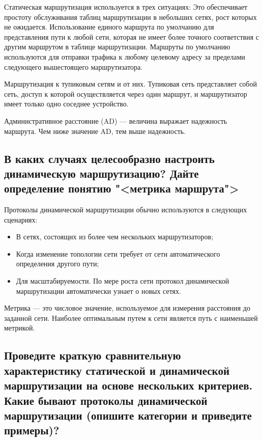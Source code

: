 Статическая маршрутизация используется в трех ситуациях:
Это обеспечивает простоту обслуживания таблиц маршрутизации 
в небольших сетях, рост которых не ожидается.
Использование единого маршрута по умолчанию для 
представления пути к любой сети, которая не имеет более точного 
соответствия с другим маршрутом в таблице маршрутизации. 
Маршруты по умолчанию используются для отправки трафика к 
любому целевому адресу за пределами следующего вышестоящего 
маршрутизатора.\par
Маршрутизация к тупиковым сетям и от них. Тупиковая сеть 
представляет собой сеть, доступ к которой осуществляется через 
один маршрут, и маршрутизатор имеет только одно соседнее 
устройство.\par
Административное расстояние (AD) --- величина выражает 
надежность маршрута. Чем ниже значение AD, тем выше надежность. 

\subsection{В каких случаях целесообразно настроить динамическую 
	маршрутизацию? Дайте определение понятию "<метрика маршрута">}

Протоколы динамической маршрутизации обычно используются в 
следующих сценариях:

\begin{itemize}
	\item В сетях, состоящих из более чем нескольких маршрутизаторов;
	\item Когда изменение топологии сети требует от сети автоматического 
		определения другого пути;
	\item Для масштабируемости. По мере роста сети протокол 
		динамической маршрутизации автоматически узнает о новых сетях.
\end{itemize}

Метрика --- это числовое значение, используемое для измерения 
расстояния до заданной сети. Наиболее оптимальным путем к сети является 
путь с наименьшей метрикой.

\subsection{Проведите краткую сравнительную характеристику 
статической и динамической маршрутизации на основе 
нескольких критериев. Какие бывают протоколы динамической 
маршрутизации (опишите категории и приведите примеры)?}

\begin{image}
\end{image}

